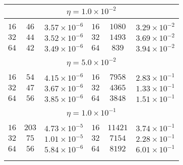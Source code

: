 \begin{table}[]
\begin{center}
\begin{tabular}{@{}ccc|ccc@{}}
\multicolumn{6}{c}{$\eta = 1.0\times 10^{-2}$} \\[5pt]
\hline\\[-11pt]
$16$ & $46$ & $3.57\times 10^{-6}$  &   $16$ & $1080$ & $3.29\times 10^{-2}$ \\ [1pt]
$32$ & $44$ & $3.52\times 10^{-6}$  &   $32$ & $1493$ & $3.69\times 10^{-2}$ \\ [1pt]
$64$ & $42$ & $3.49\times 10^{-6}$  &   $64$ & $839$ & $3.94\times 10^{-2}$  \\ [1pt]
\hline\\[-11pt]

\multicolumn{6}{c}{$\eta = 5.0\times 10^{-2}$} \\[5pt]
\hline\\[-11pt]
$16$ & $54$ & $4.15\times 10^{-6}$  &   $16$ & $7958$ & $2.83\times 10^{-1}$ \\ [1pt]
$32$ & $47$ & $3.67\times 10^{-6}$  &   $32$ & $4365$ & $1.33\times 10^{-1}$ \\ [1pt]
$64$ & $56$ & $3.85\times 10^{-6}$  &   $64$ & $3848$ & $1.51\times 10^{-1}$ \\ [1pt]
\hline\\[-11pt]

\multicolumn{6}{c}{$\eta = 1.0\times 10^{-1}$} \\[5pt]
\hline\\[-11pt]
$16$ & $203$ & $4.73\times 10^{-5}$ &   $16$ & $11421$ & $3.74\times 10^{-1}$\\ [1pt]
$32$ & $75$ & $1.01\times 10^{-5}$  &   $32$ & $7154$ & $2.28\times 10^{-1}$ \\ [1pt]
$64$ & $56$ & $5.84\times 10^{-6}$  &   $64$ & $8192$ & $6.01\times 10^{-1}$ \\ [1pt]
\hline\\[-11pt]


\hline\\[-8pt]
\end{tabular}\\[5pt]
\end{center}
\normalsize
\end{table}

